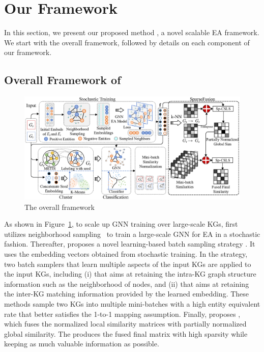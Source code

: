 

\section{Our Framework}
\label{sec:framework}
In this section, we present our proposed method \ClusterEA{}, a novel scalable EA framework. We start with the overall framework, followed by details on each component of our framework.

\subsection{Overall Framework of \ClusterEAplain{}}

\begin{figure}[t]
\centering
\includegraphics[width=6.in]{figs/framework.eps}
\vspace{-2mm}
\caption{The overall \ClusterEAplain{} framework}
\label{fig:framewrok}
\vspace*{-4mm}
\end{figure}

As shown in Figure~\ref{fig:framewrok}, to scale up GNN training over large-scale KGs, \ClusterEA{} first utilizes neighborhood sampling~\cite{GraphSAGE17} to train a large-scale GNN for EA in a stochastic fashion.
Thereafter, \ClusterEA{} proposes a novel learning-based batch sampling strategy \Sampling{}. It uses the embedding vectors obtained from stochastic training. In the strategy, two batch samplers that learn multiple aspects of the input KGs are applied to the input KGs, including
(i) \MetisGCN{} that aims at retaining the intra-KG graph structure information such as the neighborhood of nodes, and
(ii) \KMeans{} that aims at retaining the inter-KG matching information provided by the learned embedding.
These methods sample two KGs into multiple mini-batches with a high entity equivalent rate that better satisfies the 1-to-1 mapping assumption.
Finally, \ClusterEA{} proposes \Merging{}, which fuses the normalized local similarity matrices with partially normalized global similarity. The \Merging{} produces the fused final matrix with high sparsity while keeping as much valuable information as possible.


